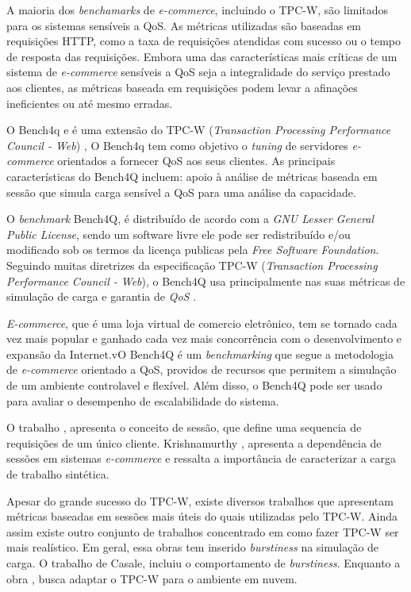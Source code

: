 A maioria dos \textit{benchamarks} de \textit{e-commerce}, incluindo o TPC-W, são limitados para os sistemas sensíveis a QoS. As métricas utilizadas são baseadas em requisições HTTP, como a taxa de requisições atendidas com sucesso ou o tempo de resposta das requisições. Embora uma das características mais críticas de um sistema de \textit{e-commerce} sensíveis a QoS seja a integralidade do serviço prestado aos clientes, as métricas baseada em requisições podem levar a afinações ineficientes ou até mesmo erradas.


O Bench4q e é uma extensão do TPC-W (\textit{Transaction Processing Performance Council - Web})
\cite{Menasce2002}, O Bench4q tem como objetivo o \textit{tuning} de servidores \textit{e-commerce} orientados a fornecer QoS aos seus clientes. As principais características do Bench4Q incluem: 
apoio à análise de métricas baseada em sessão que simula carga sensível a QoS para uma análise da capacidade. 

O \textit{benchmark} Bench4Q, é distribuído de acordo com a \textit{GNU Lesser General Public License}, sendo um software livre ele pode ser redistribuído e/ou modificado sob os termos da licença publicas pela \textit{Free Software Foundation}. Seguindo muitas diretrizes da especificação TPC-W (\textit{Transaction Processing Performance Council - Web}), o Bench4Q usa principalmente nas suas métricas de simulação de carga e garantia de \textit{QoS} \cite{Bench4Q}. 

\textit{E-commerce}, que é uma loja virtual de comercio eletrônico, tem se tornado cada vez mais popular e ganhado cada vez mais concorrência com o desenvolvimento e expansão da Internet.vO Bench4Q é um \textit{benchmarking} que segue a metodologia de \textit{e-commerce} orientado a QoS, providos de recursos que permitem a simulação de um ambiente controlavel e flexível. Além disso, o Bench4Q pode ser usado para avaliar o desempenho de escalabilidade do sistema.

O trabalho \cite{cherkasova1998}, apresenta o conceito de sessão, que define uma sequencia de requisições de um único cliente. Krishnamurthy \cite{Krishnamurthy2006}, apresenta a dependência de sessões em sistemas \textit{e-commerce} e ressalta a importância de caracterizar a carga de trabalho sintética.

Apesar do grande sucesso do TPC-W, existe diversos trabalhos que apresentam métricas baseadas em sessões mais úteis do quais utilizadas pelo TPC-W. Ainda assim existe outro conjunto de trabalhos concentrado em como fazer TPC-W ser mais realístico. Em geral, essa obras tem inserido \textit{burstiness} na simulação de carga. O trabalho \cite{Mi2009} de Casale, incluiu o comportamento de \textit{burstiness}. Enquanto a obra \textbf{\cite{Sobel2008}}, busca adaptar o TPC-W para o ambiente em nuvem.

